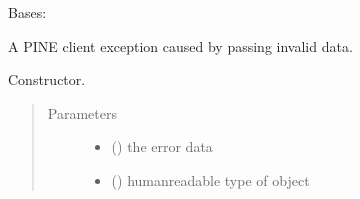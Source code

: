 \documentclass[letterpaper,10pt,english]{sphinxmanual}
\begin{document}
\begin{fulllineitems}
\label{\detokenize{autoapi/pine/client/exceptions/index:pine.client.exceptions.PineClientValueException}}
\sphinxAtStartPar
Bases: {\hyperref[\detokenize{autoapi/pine/client/exceptions/index:pine.client.exceptions.PineClientException}]{}}

\sphinxAtStartPar
A PINE client exception caused by passing invalid data.

\sphinxAtStartPar
Constructor.
\begin{quote}\begin{description}
\item[{Parameters}] \leavevmode\begin{itemize}
\item {} 
\sphinxAtStartPar
{} () \textendash{} the error data

\item {} 
\sphinxAtStartPar
{} () \textendash{} human\sphinxhyphen{}readable type of object

\end{itemize}

\end{description}\end{quote}

\end{fulllineitems}

\end{document}
